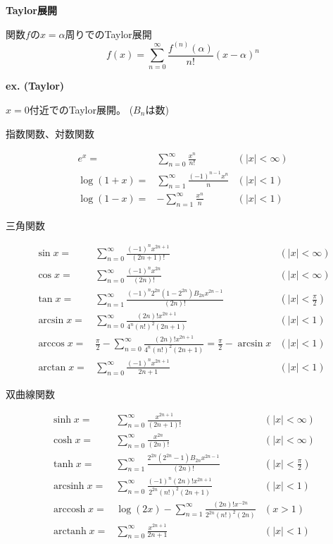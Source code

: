 \documentclass[12pt,b5paper]{ltjsarticle}
\DeclareMathOperator{\arcsinh}{arcsinh}
\DeclareMathOperator{\arccosh}{arccosh}
\DeclareMathOperator{\arctanh}{arctanh}
\begin{document}

\textbf{Taylor展開}

関数$f$の$x=\alpha$周りでのTaylor展開
\begin{equation}
 f(x) = \sum_{n=0}^{\infty} \frac{f^{(n)}(\alpha)}{n!}(x-\alpha)^n
\end{equation}

\hrulefill

\textbf{ex. (Taylor)}

$x=0$付近でのTaylor展開。
($B_{n}$は数)


\hrulefill
指数関数、対数関数
\hrulefill

\begin{align}
 e^x
 =& \sum_{n=0}^{\infty}
 \frac{x^n}{n!} & (\lvert x \rvert < \infty)\\
%
 \log (1+x)
 =& \sum_{n=1}^{\infty}
 \frac{(-1)^{n-1}x^{n}}{n} & ( \lvert x \rvert < 1)\\
%
 \log (1-x)
 =& - \sum_{n=1}^{\infty}
 \frac{x^{n}}{n} & (\lvert x \rvert < 1)
%
\end{align}

\hrulefill
三角関数
\hrulefill

\begin{align}
%
%
 \sin x
 =& \sum_{n=0}^{\infty}
 \frac{(-1)^nx^{2n+1}}{(2n+1)!} & (\lvert x \rvert < \infty)\\
%
 \cos x
 =& \sum_{n=0}^{\infty}
 \frac{(-1)^nx^{2n}}{(2n)!} & (\lvert x \rvert < \infty)\\
%
 \tan x
 =& \sum_{n=1}^{\infty}
 \frac{(-1)^n 2^{2n} (1-2^{2n})B_{2n}x^{2n-1}}{(2n)!} & \left( \lvert x \rvert < \frac{\pi}{2} \right)\\
%
 \arcsin x
 =& \sum_{n=0}^{\infty}
 \frac{(2n)!x^{2n+1}}{4^n(n!)^2(2n+1)} & ( \lvert x \rvert < 1)\\
%
 \arccos x
 =& \frac{\pi}{2} - \sum_{n=0}^{\infty}
 \frac{(2n)!x^{2n+1}}{4^n(n!)^2(2n+1)} = \frac{\pi}{2}-\arcsin x & ( \lvert x \rvert < 1)\\
%
 \arctan x
 =& \sum_{n=0}^{\infty}
 \frac{(-1)^{n}x^{2n+1}}{2n+1} & ( \lvert x \rvert < 1)
%
\end{align}


\hrulefill
双曲線関数
\hrulefill

\begin{align}
%
%
 \sinh x
 =& \sum_{n=0}^{\infty}
 \frac{x^{2n+1}}{(2n+1)!} & ( \lvert x \rvert < \infty)\\
%
 \cosh x
 =& \sum_{n=0}^{\infty}
 \frac{x^{2n}}{(2n)!} & ( \lvert x \rvert < \infty)\\
%
 \tanh x
 =& \sum_{n=1}^{\infty}
 \frac{2^{2n}(2^{2n}-1)B_{2n}x^{2n-1}}{(2n)!} & \left( \lvert x \rvert < \frac{\pi}{2} \right)\\
%
 \arcsinh x
 =& \sum_{n=0}^{\infty}
 \frac{(-1)^n (2n)! x^{2n+1}}{2^{2n}(n!)^2(2n+1)} & ( \lvert x \rvert < 1)\\
%
 \arccosh x
 =& \log (2x) - \sum_{n=1}^{\infty}
 \frac{(2n)! x^{-2n}}{2^{2n}(n!)^2(2n)} & ( x > 1 )\\
%
 \arctanh x
 =& \sum_{n=0}^{\infty}
 \frac{x^{2n+1}}{2n+1} & ( \lvert x \rvert < 1)
%
\end{align}
\end{document}
